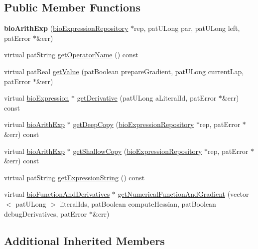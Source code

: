 \subsection*{Public Member Functions}
\begin{DoxyCompactItemize}
\item 
\mbox{\label{classbio_arith_exp_a7cd34e21bc0f74b09a59d4c44e489c4c}} 
{\bfseries bio\+Arith\+Exp} (\hyperlink{classbio_expression_repository}{bio\+Expression\+Repository} $\ast$rep, pat\+U\+Long par, pat\+U\+Long left, pat\+Error $\ast$\&err)
\item 
virtual pat\+String \hyperlink{classbio_arith_exp_a968d5d3d908d11da745e5c680ae981f9}{get\+Operator\+Name} () const
\item 
virtual pat\+Real \hyperlink{classbio_arith_exp_a291d459eb5a41df1ac6409420a8a5713}{get\+Value} (pat\+Boolean prepare\+Gradient, pat\+U\+Long current\+Lap, pat\+Error $\ast$\&err)
\item 
virtual \hyperlink{classbio_expression}{bio\+Expression} $\ast$ \hyperlink{classbio_arith_exp_ae6fb9aa47399f18af66cb4250b36f707}{get\+Derivative} (pat\+U\+Long a\+Literal\+Id, pat\+Error $\ast$\&err) const
\item 
virtual \hyperlink{classbio_arith_exp}{bio\+Arith\+Exp} $\ast$ \hyperlink{classbio_arith_exp_aec1900d14fe80411c3322358773c7ac6}{get\+Deep\+Copy} (\hyperlink{classbio_expression_repository}{bio\+Expression\+Repository} $\ast$rep, pat\+Error $\ast$\&err) const
\item 
virtual \hyperlink{classbio_arith_exp}{bio\+Arith\+Exp} $\ast$ \hyperlink{classbio_arith_exp_a3d2f7448252ebfb7133a3eeef866bea4}{get\+Shallow\+Copy} (\hyperlink{classbio_expression_repository}{bio\+Expression\+Repository} $\ast$rep, pat\+Error $\ast$\&err) const
\item 
virtual pat\+String \hyperlink{classbio_arith_exp_a3bf86cc33d7879bdf4e9e420890f6851}{get\+Expression\+String} () const
\item 
virtual \hyperlink{classbio_function_and_derivatives}{bio\+Function\+And\+Derivatives} $\ast$ \hyperlink{classbio_arith_exp_ab470a2671ba4ed891cd13c621d197fe1}{get\+Numerical\+Function\+And\+Gradient} (vector$<$ pat\+U\+Long $>$ literal\+Ids, pat\+Boolean compute\+Hessian, pat\+Boolean debug\+Derivatives, pat\+Error $\ast$\&err)
\end{DoxyCompactItemize}
\subsection*{Additional Inherited Members}


